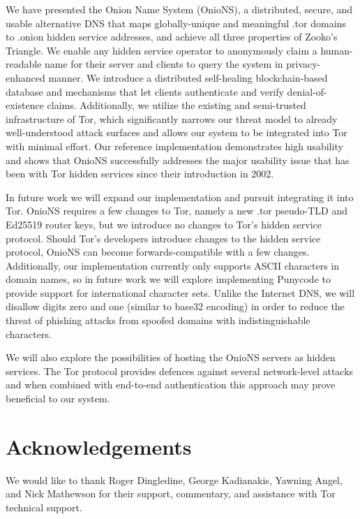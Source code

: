 \documentclass[conference]{IEEEtran}
\begin{document}
We have presented the Onion Name System (OnioNS), a distributed, secure, and usable alternative DNS that maps globally-unique and meaningful .tor domains to .onion hidden service addresses, and achieve all three properties of Zooko's Triangle. We enable any hidden service operator to anonymously claim a human-readable name for their server and clients to query the system in privacy-enhanced manner. We introduce a distributed self-healing blockchain-based database and mechanisms that let clients authenticate and verify denial-of-existence claims. Additionally, we utilize the existing and semi-trusted infrastructure of Tor, which significantly narrows our threat model to already well-understood attack surfaces and allows our system to be integrated into Tor with minimal effort. Our reference implementation demonstrates high usability and shows that OnioNS successfully addresses the major usability issue that has been with Tor hidden services since their introduction in 2002.

In future work we will expand our implementation and pursuit integrating it into Tor. OnioNS requires a few changes to Tor, namely a new .tor pseudo-TLD and Ed25519 router keys, but we introduce no changes to Tor's hidden service protocol. Should Tor's developers introduce changes to the hidden service protocol, OnioNS can become forwards-compatible with a few changes. Additionally, our implementation currently only supports ASCII characters in domain names, so in future work we will explore implementing Punycode to provide support for international character sets. Unlike the Internet DNS, we will disallow digits zero and one (similar to base32 encoding) in order to reduce the threat of phishing attacks from spoofed domains with indistinguishable characters.

We will also explore the possibilities of hosting the OnioNS servers as hidden services. The Tor protocol provides defences against several network-level attacks and when combined with end-to-end authentication this approach may prove beneficial to our system.

\section*{Acknowledgements}

We would like to thank Roger Dingledine, George Kadianakis, Yawning Angel, and Nick Mathewson for their support, commentary, and assistance with Tor technical support.

\end{document}
